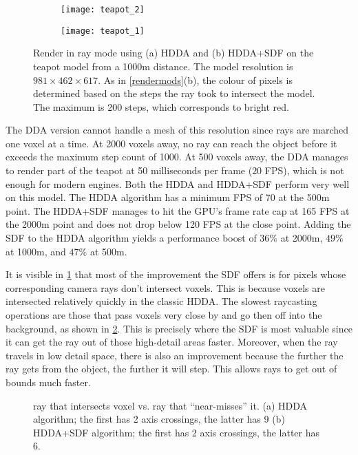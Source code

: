 \begin{figure}[H]
  \centering
  \begin{subfigure}[b]{0.48\textwidth}
    \texttt{[image: teapot\_2]}
    \caption{}
  \end{subfigure}
  \hfill
  \begin{subfigure}[b]{0.48\textwidth}
    \texttt{[image: teapot\_1]}
    \caption{}
  \end{subfigure}
  \caption[Teapot HDDA vs. HDDA+SDF comparison]{Render in ray mode using (a) HDDA and (b) HDDA+SDF on the teapot model from a 1000m distance. The model resolution is $981\times462\times617$. As in \cref{rendermods}(b), the colour of pixels is determined based on the steps the ray took to intersect the model. The maximum is 200 steps, which corresponds to bright red.}
  \label{teacomp}
\end{figure}

The DDA version cannot handle a mesh of this resolution since rays are marched one voxel at a time. At 2000 voxels away, no ray can reach the object before it exceeds the maximum step count of 1000. At 500 voxels away, the DDA manages to render part of the teapot at 50 milliseconds per frame ($20$ FPS), which is not enough for modern engines.
Both the HDDA and HDDA+SDF perform very well on this model. The HDDA algorithm has a minimum FPS of 70 at the 500m point. The HDDA+SDF manages to hit the GPU's frame rate cap at 165 FPS at the 2000m point and does not drop below 120 FPS at the close point. Adding the SDF to the HDDA algorithm yields a performance boost of $36\%$ at 2000m, $49\%$ at 1000m, and $47\%$ at 500m.

It is visible in \cref{teacomp} that most of the improvement the SDF offers is for pixels whose corresponding camera rays don't intersect voxels. This is because voxels are intersected relatively quickly in the classic HDDA. The slowest raycasting operations are those that pass voxels very close by and go then off into the background, as shown in \cref{steps}. This is precisely where the SDF is most valuable since it can get the ray out of those high-detail areas faster. Moreover, when the ray travels in low detail space, there is also an improvement because the further the ray gets from the object, the further it will step. This allows rays to get out of bounds much faster.

\begin{figure}[H]
  \centering
  \begin{subfigure}{0.45\textwidth}
    \centering
    
    \caption{}
  \end{subfigure}
  \begin{subfigure}{0.45\textwidth}
    \centering
    
    \caption{}
  \end{subfigure}
  \caption[HDDA vs. HDDA+SDF near-miss diagram]{ray that intersects voxel vs. ray that ``near-misses'' it. (a) HDDA algorithm; the first has 2 axis crossings, the latter has 9 (b) HDDA+SDF algorithm; the first has 2 axis crossings, the latter has 6.}
  \label{steps}
\end{figure}

